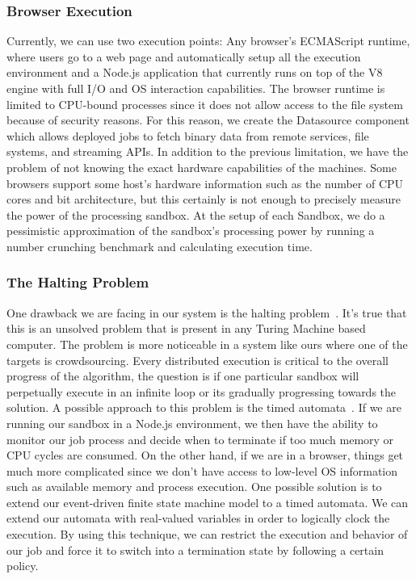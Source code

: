 \documentclass[10pt,reprint]{socc14}
\begin{document}
\subsubsection{Browser Execution}
Currently, we can use two execution points: Any browser’s ECMAScript runtime, where users go to a web page and automatically setup all the execution environment and a Node.js application that currently runs on top of the V8 engine with full I/O and OS interaction capabilities. The browser runtime is limited to CPU-bound processes since it does not allow access to the file system because of security reasons. For this reason, we create the Datasource component which allows deployed jobs to fetch binary data from remote services, file systems, and streaming APIs. In addition to the previous limitation, we have the problem of not knowing the exact hardware capabilities of the machines. Some browsers support some host’s hardware information such as the number of CPU cores and bit architecture, but this certainly is not enough to precisely measure the power of the processing sandbox. At the setup of each Sandbox, we do a pessimistic approximation of the sandbox’s processing power by running a number crunching benchmark and calculating execution time.


\subsubsection{The Halting Problem}
One drawback we are facing in our system is the halting problem~\cite{Turing1937a}. It’s true that this is an unsolved problem that is present in any Turing Machine based computer. The problem is more noticeable in a system like ours where one of the targets is crowdsourcing. Every distributed execution is critical to the overall progress of the  algorithm, the question is if one particular sandbox will perpetually execute in an infinite loop or its gradually progressing towards the solution. A possible approach to this problem is the timed automata~\cite{Alur1994}. If we are running our sandbox in a Node.js environment, we then have the ability to monitor our job process and decide when to terminate if too much memory or CPU cycles are consumed. On the other hand, if we are in a browser, things get much more complicated since we don't have access to low-level OS information such as available memory and process execution. One possible solution is to extend our event-driven finite state machine model to a timed automata. We can extend our automata with real-valued variables in order to logically clock the execution. By using this technique, we can restrict the execution and behavior of our job and force it to switch into a termination state by following a certain policy.
\end{document}
